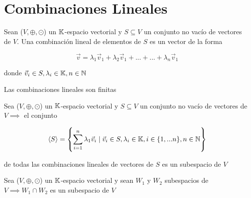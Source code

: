 \section{Combinaciones Lineales}

\begin{definition}
    Sean ($V, \oplus, \odot$)  un $\mathbb{K}$-espacio vectorial y $S \subseteq V$ un conjunto no vacío de vectores de $V$. Una combinación lineal de elementos de $S$ es un vector de la forma

    \begin{equation*}
        \vec{v}= {\lambda}_{1}{\vec{v}}_{1}+{\lambda}_{2}{\vec{v}}_{1}+...+...+{\lambda}_{n}{\vec{v}}_{1}
    \end{equation*}

    donde ${\vec{v}}_{i} \in S, {\lambda}_{i} \in \mathbb{K}, n \in \mathbb{N}$
\end{definition}

\begin{remark}
    Las combinaciones lineales son finitas
\end{remark}

\begin{theorem} \label{teo5}
    Sea ($V, \oplus, \odot$)  un $\mathbb{K}$-espacio vectorial y $S \subseteq V$ un conjunto no vacío de vectores de $V \implies $ el conjunto

    \begin{equation*}
        \langle S \rangle = \left\{ \sum_{i=1}^{n} {\lambda}_{1}{\vec{v}}_{i} \mid {\vec{v}}_{i} \in S, {\lambda}_{i} \in \mathbb{K}, i \in \{1,...n\},n \in \mathbb{N} \right\}
    \end{equation*}

      de todas las combinaciones lineales de vectores de $S$ es un subespacio de $V$
\end{theorem}

\begin{lemma}
     Sea ($V, \oplus, \odot$)  un $\mathbb{K}$-espacio vectorial y sean $W_1$ y $W_2$ subespacios de $V \implies W_1 \cap W_2$ es un subespacio de $V$
\end{lemma}


